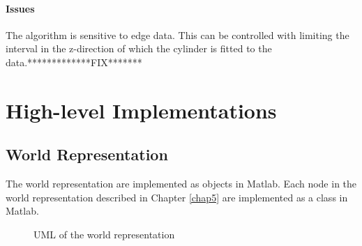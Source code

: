 \paragraph{Issues}
The algorithm is sensitive to edge data. This can be controlled with limiting the interval
in the z-direction of which the cylinder is fitted to the data.*************FIX*******


\section{High-level Implementations}

\subsection{World Representation}
The world representation are implemented as objects in Matlab. Each node in the world
representation described in Chapter \ref{chap5} are implemented as a class in Matlab. 
\begin{figure}[htbp]
    \centering
    \caption{UML of the world representation}
    \label{chap6:fig-world-uml}
\end{figure}






